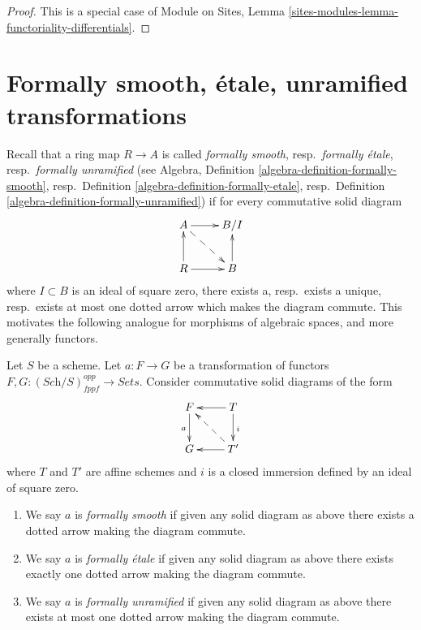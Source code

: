 \begin{proof}
This is a special case of
Module on Sites, Lemma \ref{sites-modules-lemma-functoriality-differentials}.
\end{proof}






\section{Formally smooth, \'etale, unramified transformations}
\label{section-formally-smooth-etale-unramified}

\noindent
Recall that a ring map $R \to A$ is called
{\it formally smooth}, resp.\ {\it formally \'etale},
resp.\ {\it formally unramified}
(see Algebra, Definition \ref{algebra-definition-formally-smooth},
resp.\ Definition \ref{algebra-definition-formally-etale},
resp.\ Definition \ref{algebra-definition-formally-unramified})
if for every commutative solid diagram
$$
\xymatrix{
A \ar[r] \ar@{-->}[rd] & B/I \\
R \ar[r] \ar[u] & B \ar[u]
}
$$
where $I \subset B$ is an ideal of square zero, there
exists a, resp.\ exists a unique, resp.\ exists at most one dotted
arrow which makes the diagram commute. This motivates
the following analogue for morphisms of algebraic spaces, and more
generally functors.

\begin{definition}
\label{definition-formally-smooth-etale-unramified}
Let $S$ be a scheme.
Let $a : F \to G$ be a transformation of functors
$F, G : (\textit{Sch}/S)_{fppf}^{opp} \to \textit{Sets}$.
Consider commutative solid diagrams of the form
$$
\xymatrix{
F \ar[d]_a & T \ar[d]^i \ar[l] \\
G & T' \ar[l] \ar@{-->}[lu]
}
$$
where $T$ and $T'$ are affine schemes and $i$ is a closed immersion
defined by an ideal of square zero.
\begin{enumerate}
\item We say $a$ is {\it formally smooth} if given any solid
diagram as above there exists a dotted arrow making the diagram
commute.
\item We say $a$ is {\it formally \'etale} if given any solid
diagram as above there exists exactly one dotted arrow making the diagram
commute.
\item We say $a$ is {\it formally unramified} if given any solid
diagram as above there exists at most one dotted arrow making the diagram
commute.
\end{enumerate}
\end{definition}

